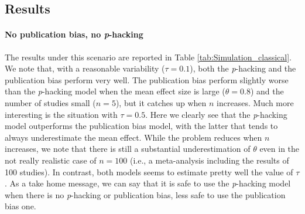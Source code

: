 \documentclass[preprint, authoryear]{elsarticle}
\theoremstyle{plain}
\theoremstyle{definition}
\begin{document}
\subsection{Results}
\paragraph{No publication bias, no \emph{p}-hacking} The results under this scenario are reported in Table \ref{tab:Simulation_classical}. We note that, with a reasonable variability ($\tau = 0.1$), both the \emph{p}-hacking and the publication bias perform very well. The publication bias perform slightly worse than the \emph{p}-hacking model when the mean effect size is large ($\theta = 0.8$) and the number of studies small ($n=5$), but it catches up when $n$ increases. Much more interesting is the situation with $\tau = 0.5$. Here we clearly see that the \emph{p}-hacking model outperforms the publication bias model, with the latter that tends to always underestimate the mean effect. While the problem reduces when $n$ increases, we note that there is still a substantial underestimation of $\theta$ even in the not really realistic case of $n = 100$ (i.e., a meta-analysis including the results of 100 studies). In contrast, both models seems to estimate pretty well the value of $\tau$. As a take home message, we can say that it is safe to use the \emph{p}-hacking model when there is no \emph{p}-hacking or publication bias, less safe to use the publication bias one.
\end{document}
